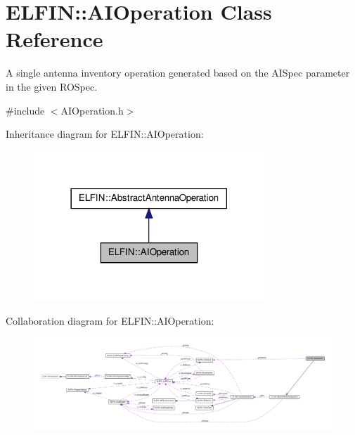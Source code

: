 \hypertarget{class_e_l_f_i_n_1_1_a_i_operation}{\section{E\-L\-F\-I\-N\-:\-:A\-I\-Operation Class Reference}
\label{class_e_l_f_i_n_1_1_a_i_operation}
}


A single antenna inventory operation generated based on the A\-I\-Spec parameter in the given R\-O\-Spec.  




{\ttfamily \#include $<$A\-I\-Operation.\-h$>$}



Inheritance diagram for E\-L\-F\-I\-N\-:\-:A\-I\-Operation\-:
\nopagebreak
\begin{figure}[H]
\begin{center}
\leavevmode
\includegraphics[width=246pt]{class_e_l_f_i_n_1_1_a_i_operation__inherit__graph}
\end{center}
\end{figure}


Collaboration diagram for E\-L\-F\-I\-N\-:\-:A\-I\-Operation\-:
\nopagebreak
\begin{figure}[H]
\begin{center}
\leavevmode
\includegraphics[width=350pt]{class_e_l_f_i_n_1_1_a_i_operation__coll__graph}
\end{center}
\end{figure}
